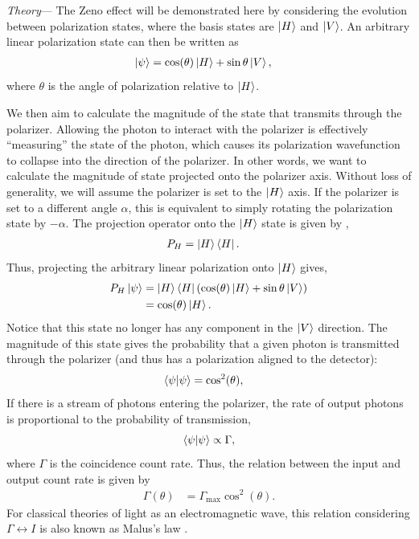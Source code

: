 \documentclass[%
reprint,
superscriptaddress,
nofootinbib,
nobibnotes,
nobalancelastpage,
amsmath,amssymb,
aps, 
prl,
floatfix,
]{revtex4-2}
\renewcommand{\section}[1]{\textit{#1}---\ignorespaces}
\begin{document}
\section{Theory}
The Zeno effect will be demonstrated here by considering the evolution between polarization states, where the basis states are $\ket{H}$ and $\ket{V}$. An arbitrary linear polarization state can then be written as 
\begin{align}
    \ket{\psi} &= \cos(\theta)\ket{H} + \sin{\theta}\ket{V},
\end{align}
where $\theta$ is the angle of polarization relative to $\ket{H}$.

We then aim to calculate the magnitude of the state that transmits through the polarizer. Allowing the photon to interact with the polarizer is effectively ``measuring'' the state of the photon, which causes its polarization wavefunction to collapse into the direction of the polarizer. In other words, we want to calculate the magnitude of state projected onto the polarizer axis. Without loss of generality, we will assume the polarizer is set to the $\ket{H}$ axis. If the polarizer is set to a different angle $\alpha$, this is equivalent to simply rotating the polarization state by $-\alpha$. The projection operator onto the $\ket{H}$ state is given by \cite{griffithsIntroductionQuantumMechanics2018},
\begin{align}
    P_H &= \ket{H}\bra{H}\nonumber.
\end{align}
Thus, projecting the arbitrary linear polarization onto $\ket{H}$ gives,
\begin{align}
    P_H \ket{\psi} &= \ket{H}\bra{H}(\cos(\theta)\ket{H} + \sin{\theta}\ket{V}) \nonumber \\
    &= \cos(\theta)\ket{H}\nonumber.
\end{align}
Notice that this state no longer has any component in the $\ket{V}$ direction. The magnitude of this state gives the probability that a given photon is transmitted through the polarizer (and thus has a polarization aligned to the detector):
\begin{align}
    \braket{\psi|\psi} &= \cos^2(\theta)\nonumber,
\end{align}
If there is a stream of photons entering the polarizer, the rate of output photons is proportional to the probability of transmission,
\begin{align}
    \braket{\psi|\psi} \propto \Gamma\nonumber,
\end{align}
where $\Gamma$ is the coincidence count rate. Thus, the relation between the input and output count rate is given by
\begin{align}
    \Gamma(\theta) &= \Gamma_\text{max}\cos^2(\theta). \label{eq:onepol}
\end{align}
For classical theories of light as an electromagnetic wave, this relation considering $\Gamma \leftrightarrow I$ is also known as Malus's law \cite{hechtOptics2017}.
\end{document}
